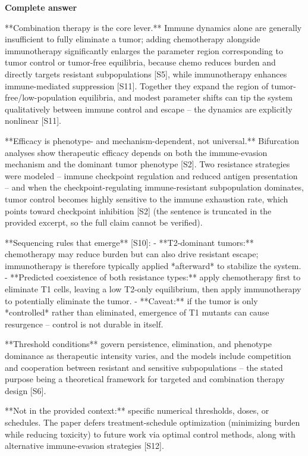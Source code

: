 \documentclass[10pt]{article}
\begin{document}
\textbf{Complete answer}
\begin{AnswerText}
**Combination therapy is the core lever.** Immune dynamics alone are generally insufficient to fully eliminate a tumor; adding chemotherapy alongside immunotherapy significantly enlarges the parameter region corresponding to tumor control or tumor-free equilibria, because chemo reduces burden and directly targets resistant subpopulations [S5], while immunotherapy enhances immune-mediated suppression [S11]. Together they expand the region of tumor-free/low-population equilibria, and modest parameter shifts can tip the system qualitatively between immune control and escape -- the dynamics are explicitly nonlinear [S11].

**Efficacy is phenotype- and mechanism-dependent, not universal.** Bifurcation analyses show therapeutic efficacy depends on both the immune-evasion mechanism and the dominant tumor phenotype [S2]. Two resistance strategies were modeled -- immune checkpoint regulation and reduced antigen presentation -- and when the checkpoint-regulating immune-resistant subpopulation dominates, tumor control becomes highly sensitive to the immune exhaustion rate, which points toward checkpoint inhibition [S2] (the sentence is truncated in the provided excerpt, so the full claim cannot be verified).

**Sequencing rules that emerge** [S10]:
- **T2-dominant tumors:** chemotherapy may reduce burden but can also drive resistant escape; immunotherapy is therefore typically applied *afterward* to stabilize the system.
- **Predicted coexistence of both resistance types:** apply chemotherapy first to eliminate T1 cells, leaving a low T2-only equilibrium, then apply immunotherapy to potentially eliminate the tumor.
- **Caveat:** if the tumor is only *controlled* rather than eliminated, emergence of T1 mutants can cause resurgence -- control is not durable in itself.

**Threshold conditions** govern persistence, elimination, and phenotype dominance as therapeutic intensity varies, and the models include competition and cooperation between resistant and sensitive subpopulations -- the stated purpose being a theoretical framework for targeted and combination therapy design [S6].

**Not in the provided context:** specific numerical thresholds, doses, or schedules. The paper defers treatment-schedule optimization (minimizing burden while reducing toxicity) to future work via optimal control methods, along with alternative immune-evasion strategies [S12].
\end{AnswerText}
\end{document}
